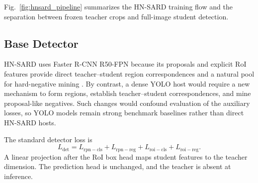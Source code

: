 \documentclass[conference,a4paper]{IEEEtran}
\begin{document}
Fig.~\ref{fig:hnsard_pipeline} summarizes the HN-SARD training flow and the separation between frozen teacher crops and full-image student detection.

\subsection{Base Detector}
HN-SARD uses Faster R-CNN R50-FPN because its proposals and explicit RoI features provide direct teacher--student region correspondences and a natural pool for hard-negative mining \cite{ren2015faster}. By contrast, a dense YOLO host would require a new mechanism to form regions, establish teacher--student correspondences, and mine proposal-like negatives. Such changes would confound evaluation of the auxiliary losses, so YOLO models remain strong benchmark baselines rather than direct HN-SARD hosts.

The standard detector loss is
\begin{equation}
L_{\mathrm{det}} = L_{\mathrm{rpn-cls}} + L_{\mathrm{rpn-reg}} + L_{\mathrm{roi-cls}} + L_{\mathrm{roi-reg}}.
\end{equation}
A linear projection after the RoI box head maps student features to the teacher dimension. The prediction head is unchanged, and the teacher is absent at inference.

\begin{table}[!t]
\centering
\caption{Test-set comparison of detectors.}
\label{tab:baselines}
\end{table}
\end{document}
